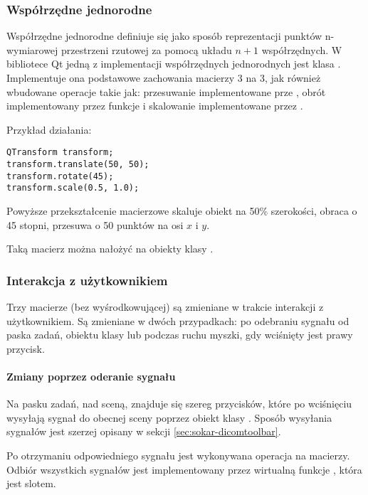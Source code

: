 \label{sec:algorithm-pixmap-transformat}

\subsubsection{Współrzędne jednorodne}

Współrzędne jednorodne definiuje się jako sposób reprezentacji punktów n-wymiarowej przestrzeni rzutowej za pomocą układu $n+1$ współrzędnych.
W bibliotece Qt jedną z implementacji współrzędnych jednorodnych jest klasa .
Implementuje ona podstawowe zachowania macierzy 3 na 3, jak również wbudowane operacje takie jak: przesuwanie implementowane prze , obrót implementowany przez funkcje  i skalowanie implementowane przez .

Przykład działania:
\begin{lstlisting}
QTransform transform;
transform.translate(50, 50);
transform.rotate(45);
transform.scale(0.5, 1.0);
\end{lstlisting}
Powyższe przekształcenie macierzowe skaluje obiekt na 50\% szerokości, obraca o 45 stopni, przesuwa o 50 punktów na osi $x$ i $y$.

\par
Taką macierz można nałożyć na obiekty klasy .

\subsubsection{Interakcja z użytkownikiem}

Trzy macierze (bez wyśrodkowującej) są zmieniane w trakcie interakcji z użytkownikiem.
Są zmieniane w dwóch przypadkach: po odebraniu sygnału od paska zadań, obiektu klasy  lub podczas ruchu myszki, gdy wciśnięty jest prawy przycisk.

\paragraph{Zmiany poprzez oderanie sygnału}

\par
Na pasku zadań, nad sceną, znajduje się szereg przycisków, które po wciśnięciu wysyłają sygnał do obecnej sceny poprzez obiekt klasy .
Sposób wysyłania sygnałów jest szerzej opisany w sekcji \ref{sec:sokar-dicomtoolbar}.

\par
Po otrzymaniu odpowiedniego sygnału jest wykonywana operacja na macierzy.
Odbiór wszystkich sygnałów jest implementowany przez wirtualną funkcje , która jest slotem.

